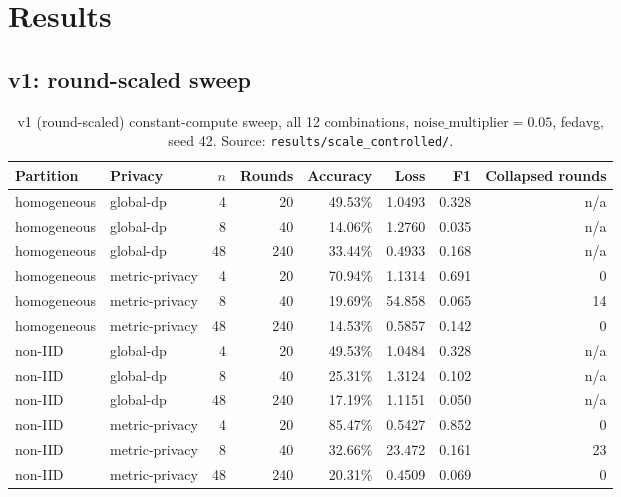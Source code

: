 \documentclass[11pt]{article}
\newcommand{\code}[1]{\texttt{#1}}
\begin{document}
\section{Results}
\label{sec:results}

\subsection{v1: round-scaled sweep}
\label{sec:v1findings}

\begin{table}[h]
\centering
\small
\begin{tabular}{llrrrrrr}
\toprule
Partition & Privacy & $n$ & Rounds & Accuracy & Loss & F1 & Collapsed rounds \\
\midrule
homogeneous & global-dp        & 4  & 20  & 49.53\% & 1.0493  & 0.328 & n/a \\
homogeneous & global-dp        & 8  & 40  & 14.06\% & 1.2760  & 0.035 & n/a \\
homogeneous & global-dp        & 48 & 240 & 33.44\% & 0.4933  & 0.168 & n/a \\
homogeneous & metric-privacy   & 4  & 20  & 70.94\% & 1.1314  & 0.691 & 0 \\
homogeneous & metric-privacy   & 8  & 40  & 19.69\% & 54.858  & 0.065 & 14 \\
homogeneous & metric-privacy   & 48 & 240 & 14.53\% & 0.5857  & 0.142 & 0 \\
non-IID     & global-dp        & 4  & 20  & 49.53\% & 1.0484  & 0.328 & n/a \\
non-IID     & global-dp        & 8  & 40  & 25.31\% & 1.3124  & 0.102 & n/a \\
non-IID     & global-dp        & 48 & 240 & 17.19\% & 1.1151  & 0.050 & n/a \\
non-IID     & metric-privacy   & 4  & 20  & 85.47\% & 0.5427  & 0.852 & 0 \\
non-IID     & metric-privacy   & 8  & 40  & 32.66\% & 23.472  & 0.161 & 23 \\
non-IID     & metric-privacy   & 48 & 240 & 20.31\% & 0.4509  & 0.069 & 0 \\
\bottomrule
\end{tabular}
\caption{v1 (round-scaled) constant-compute sweep, all 12 combinations,
$\text{noise\_multiplier}=0.05$, fedavg, seed 42. Source: \code{results/scale\_controlled/}.}
\label{tab:v1}
\end{table}
\end{document}
